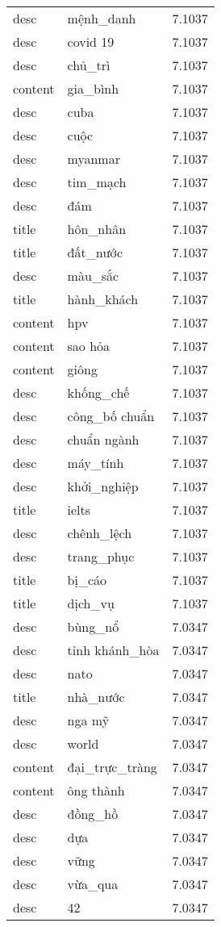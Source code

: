 \documentclass{article}
\begin{document}
\begin{tabular}{lll}
desc & mệnh\_danh & 7.1037\\
desc & covid 19 & 7.1037\\
desc & chủ\_trì & 7.1037\\
content & gia\_bình & 7.1037\\
desc & cuba & 7.1037\\
desc & cuộc & 7.1037\\
desc & myanmar & 7.1037\\
desc & tim\_mạch & 7.1037\\
desc & đám & 7.1037\\
title & hôn\_nhân & 7.1037\\
title & đất\_nước & 7.1037\\
desc & màu\_sắc & 7.1037\\
title & hành\_khách & 7.1037\\
content & hpv & 7.1037\\
content & sao hỏa & 7.1037\\
content & giông & 7.1037\\
desc & khống\_chế & 7.1037\\
desc & công\_bố chuẩn & 7.1037\\
desc & chuẩn ngành & 7.1037\\
desc & máy\_tính & 7.1037\\
desc & khởi\_nghiệp & 7.1037\\
title & ielts & 7.1037\\
desc & chênh\_lệch & 7.1037\\
desc & trang\_phục & 7.1037\\
title & bị\_cáo & 7.1037\\
title & dịch\_vụ & 7.1037\\
desc & bùng\_nổ & 7.0347\\
desc & tỉnh khánh\_hòa & 7.0347\\
desc & nato & 7.0347\\
title & nhà\_nước & 7.0347\\
desc & nga mỹ & 7.0347\\
desc & world & 7.0347\\
content & đại\_trực\_tràng & 7.0347\\
content & ông thành & 7.0347\\
desc & đồng\_hồ & 7.0347\\
desc & dựa & 7.0347\\
desc & vững & 7.0347\\
desc & vừa\_qua & 7.0347\\
desc & 42 & 7.0347\\

\end{tabular}
\end{document}
